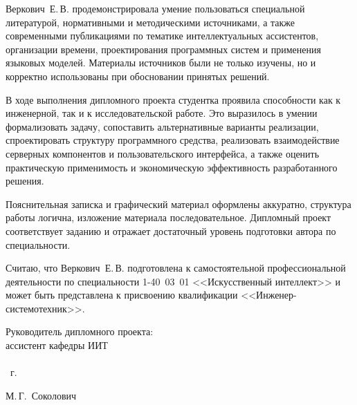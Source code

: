 \begin{singlespace}
{Веркович~Е.\,В. продемонстрировала умение пользоваться специальной литературой, нормативными и методическими источниками, а также современными публикациями по тематике интеллектуальных ассистентов, организации времени, проектирования программных систем и применения языковых моделей. Материалы источников были не только изучены, но и корректно использованы при обосновании принятых решений.

В ходе выполнения дипломного проекта студентка проявила способности как к инженерной, так и к исследовательской работе. Это выразилось в умении формализовать задачу, сопоставить альтернативные варианты реализации, спроектировать структуру программного средства, реализовать взаимодействие серверных компонентов и пользовательского интерфейса, а также оценить практическую применимость и экономическую эффективность разработанного решения.

Пояснительная записка и графический материал оформлены аккуратно, структура работы логична, изложение материала последовательное. Дипломный проект соответствует заданию и отражает достаточный уровень подготовки автора по специальности.

Считаю, что Веркович~Е.\,В. подготовлена к самостоятельной профессиональной деятельности по специальности 1-40~03~01 <<Искусственный интеллект>> и может быть представлена к присвоению квалификации <<Инженер-системотехник>>.

  \vfill
  \noindent
  \begin{minipage}{0.54\textwidth}
    \begin{flushleft}
      Руководитель дипломного проекта:\\
      ассистент кафедры ИИТ\\
      \mbox{}\\
      \underline{\hspace*{2em}} \underline{\hspace*{6.5em}} \the\year{}~г.
    \end{flushleft}
  \end{minipage}
  \begin{minipage}{0.44\textwidth}
    \begin{flushright}
      \underline{\hspace*{3cm}} М.\,Г.~Соколович
    \end{flushright}
  \end{minipage}
 }

\end{singlespace}


\clearpage